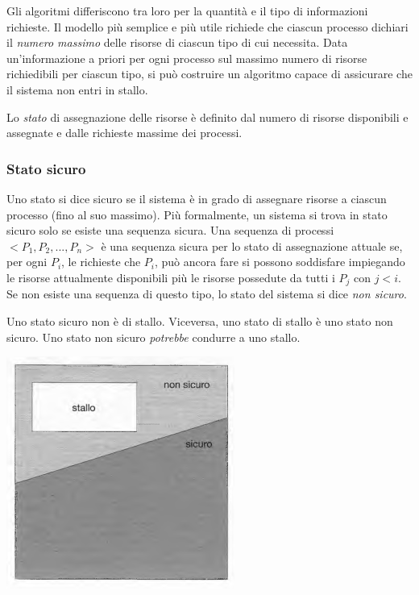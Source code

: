 \documentclass[11pt,a4paper]{article}
\begin{document}
Gli algoritmi differiscono tra loro per la quantità e il tipo di informazioni richieste. Il
modello più semplice e più utile richiede che ciascun processo dichiari il \emph{numero massimo}
delle risorse di ciascun tipo di cui necessita. Data un'informazione a priori per ogni proces­so sul massimo numero di risorse richiedibili per ciascun tipo, si può costruire un algoritmo
capace di assicurare che il sistema non entri in stallo.

Lo \emph{stato} di assegnazione
delle risorse è definito dal numero di risorse disponibili e assegnate e dalle richieste massime
dei processi.

\subsubsection{Stato sicuro}
Uno stato si dice sicuro se il sistema è in grado di assegnare risorse a ciascun processo (fino al
suo massimo). Più formalmente, un
sistema si trova in stato sicuro solo se esiste una sequenza sicura. Una sequenza di processi
$<P_1, P_2, ..., P_n>$ è una sequenza sicura per lo stato di assegnazione attuale se, per ogni $P_i$, le
richieste che $P_i$, può ancora fare si possono soddisfare impiegando le risorse attualmente di­sponibili più le risorse possedute da tutti i $P_j$ con $j<i$.
Se non esiste una sequenza di questo
tipo, lo stato del sistema si dice \emph{non sicuro}.

Uno stato sicuro non è di stallo. Viceversa, uno stato di stallo è uno stato non sicuro. Uno stato non sicu­ro \emph{potrebbe} condurre a uno stallo.
\begin{center}
  \includegraphics[scale=0.6]{img/0037.png}
\end{center}
\end{document}
